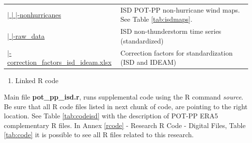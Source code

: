 \documentclass[12pt,oneside]{reedthesis}
\providecommand{\tightlist}{%
  \setlength{\itemsep}{0pt}\setlength{\parskip}{0pt}}
\begin{document}
\begin{longtable}[t]{>{\raggedright\arraybackslash}p{2.2in}>{\raggedright\arraybackslash}p{4in}}
\href{ftp://ftp.geocorp.co/windthesis/potpp/isd/maps/nonhurricanes/}{  |    |    |-nonhurricanes} & ISD POT-PP non-hurricane wind maps. See Table \ref{tab:isdmaps}.\\
\href{ftp://ftp.geocorp.co/windthesis/potpp/isd/raw_data/}{  |    |-raw\_data} & ISD non-thunderstorm time series (standardized)\\
\href{ftp://ftp.geocorp.co/windthesis/potpp/correction_factors_isd_ideam.xlsx}{  |-correction\_factors\_isd\_ideam.xlsx} & Correction factors for standardization (ISD and IDEAM)\\
\bottomrule
\end{longtable}
\endgroup{}
\begin{enumerate}
\def\labelenumi{\arabic{enumi}.}
\setcounter{enumi}{3}
\tightlist
\item
  Linked R code
\end{enumerate}
Main file \textbf{pot\_pp\_isd.r}, runs supplemental code using the R command \emph{source}. Be sure that all R code files listed in next chunk of code, are pointing to the right location. See Table \ref{tab:codeisd} with the description of POT-PP ERA5 complementary R files. In Annex \ref{rcode} - Research R Code - Digital Files, Table \ref{tab:code} it is possible to see all R files related to this research.

\scriptsize
\end{document}

